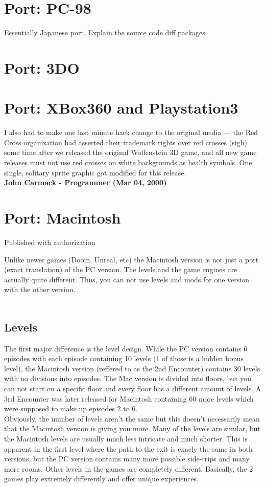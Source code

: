 \documentclass[book.tex]{subfiles}
\begin{document}
\section{Port: PC-98}
Essentially Japanese port. Explain the source code diff packages.
\section{Port: 3DO}
\section{Port: XBox360 and Playstation3}

\begin{fancyquotes}
I also had to make one last minute hack change to the original media — the Red Cross organization had asserted their trademark rights over red crosses (sigh) some time after we released the original Wolfenstein 3D game, and all new game releases must not use red crosses on white backgrounds as health symbols.  One single, solitary sprite graphic got modified for this release.
\\
\textbf{John Carmack - Programmer (Mar 04, 2000)}
\end{fancyquotes}
\section{Port: Macintosh}

Published with authorization

Unlike newer games (Doom, Unreal, etc) the Macintosh version is not just a port (exact translation) of the PC version. The levels and the game engines are actually quite different. Thus, you can not use levels and mods for one version with the other version.\\
\\
\subsection{Levels}

The first major difference is the level design. While the PC version contains 6 episodes with each episode containing 10 levels (1 of those is a hidden bonus level), the Macintosh version (reffered to as the 2nd Encounter) contains 30 levels with no divisions into episodes. The Mac version is divided into floors, but you can not start on a specific floor and every floor has a different amount of levels. A 3rd Encounter was later released for Macintosh containing 60 more levels which were supposed to make up episodes 2 to 6.\\
Obviously, the number of levels aren't the same but this doesn't necessarily mean that the Macintosh version is giving you more. Many of the levels are similar, but the Macintosh levels are usually much less intricate and much shorter. This is apparent in the first level where the path to the exit is exacly the same in both versions, but the PC version contains many more possible side-trips and many more rooms. Other levels in the games are completely different. Basically, the 2 games play extremely differently and offer unique experiences.
\end{document}
